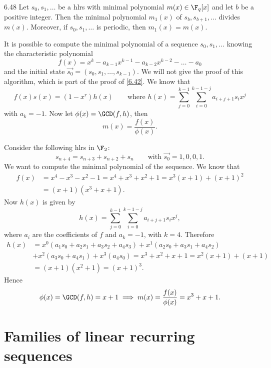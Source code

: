 \begin{teor}{}{6.48}
	Let \(s_0,s_1,\ldots\) be a hlrs with minimal polynomial \(m(x)\in\F_q[x]\) and let \(b\) be a positive integer. Then the minimal polynomial \(m_1(x)\) of \(s_b,s_{b+1},\ldots\) divides \(m(x)\). Moreover, if \(s_0,s_1,\ldots\) is periodic, then \(m_1(x)=m(x)\). 
\end{teor}

\begin{oss}\label{minAlg}
	It is possible to compute the minimal polynomial of a sequence \(s_0,s_1,\ldots\) knowing the characteristic polynomial
	\[
		f(x) = x^k-a_{k-1}x^{k-1}-a_{k-2}x^{k-2}-\ldots-a_0
	\]
	and the initial state \(\vec{s_0}=(s_0,s_1,\ldots,s_{k-1})\). We will not give the proof of this algorithm, which is part of the proof of \autoref{6.42}. We know that
	\[
		f(x)s(x) = (1-x^r)h(x) \qquad\text{where }h(x) = \sum_{j=0}^{k-1}\sum_{i=0}^{k-1-j}a_{i+j+1}s_i x^j
	\]
	with \(a_k=-1\). Now let \(\phi(x) = \GCD(f,h)\), then
	\[
		m(x) = \frac{f(x)}{\phi(x)}.
	\]
\end{oss}

\begin{ese}
	Consider the following hlrs in \(\F_2\):
	\[
		s_{n+4}=s_{n+3}+s_{n+2}+s_n \qquad\text{with }\vec{s_0}={1,0,0,1}.
	\]
	We want to compute the minimal polynomial of the sequence. We know that
	\begin{align*}
		f(x) & = x^4-x^3-x^2-1 = x^4+x^3+x^2+1 = x^3(x+1) + (x+1)^2 \\
		     & = (x+1)(x^3+x+1).
	\end{align*}
	Now \(h(x)\) is given by
	\[
		h(x) = \sum_{j=0}^{k-1}\sum_{i=0}^{k-1-j}a_{i+j+1}s_i x^j,
	\]
	where \(a_i\) are the coefficients of \(f\) and \(a_k=-1\), with \(k=4\). Therefore
	\begin{align*}
		h(x) & = x^0(a_1s_0+a_2s_1+a_3s_2+a_4s_3) + x^1(a_2s_0+a_3s_1+a_4s_2)      \\
		     & + x^2(a_3s_0+a_4s_1) + x^3(a_4s_0) = x^3+x^2+x+1 = x^2(x+1) + (x+1) \\
		     & = (x+1)(x^2+1) = (x+1)^3.
	\end{align*}
	Hence
	\[
		\phi(x) = \GCD(f,h) = x+1 \implies m(x) = \frac{f(x)}{\phi(x)} = x^3+x+1.
	\]
\end{ese}

\section{Families of linear recurring sequences}

